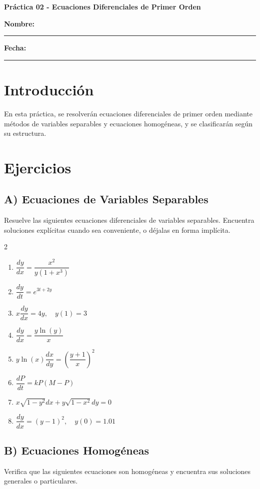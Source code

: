 \documentclass[a4paper,11pt]{article}
\begin{document}
\begin{center}
    \Large\textbf{Práctica 02 - Ecuaciones Diferenciales de Primer Orden}\\[0.5cm]  

\end{center}
  \textbf{Nombre:} \rule{9cm}{0.4pt}  \textbf{Fecha:} \rule{4.5cm}{0.4pt}

\section*{Introducción}
En esta práctica, se resolverán ecuaciones diferenciales de primer orden mediante métodos de variables separables y ecuaciones homogéneas, y se clasificarán según su estructura.

\section*{Ejercicios}

\subsection*{A) Ecuaciones de Variables Separables}
Resuelve las siguientes ecuaciones diferenciales de variables separables. Encuentra soluciones explícitas cuando sea conveniente, o déjalas en forma implícita.

\begin{multicols}{2}
\begin{enumerate}[itemsep=0.1cm]
    \item $\dfrac{dy}{dx} = \dfrac{x^2}{y(1+x^3)}$
    \item $\dfrac{dy}{dt} = e^{3t+2y}$
    \item $x \dfrac{dy}{dx} = 4y, \quad y(1) = 3$
    \item $\dfrac{dy}{dx} = \dfrac{y\ln(y)}{x}$
    \item $y \ln(x) \dfrac{dx}{dy} = \left(\dfrac{y+1}{x}\right)^2$
    \item $\dfrac{dP}{dt} = k P(M - P)$
    \item $x \sqrt{1-y^2} dx + y \sqrt{1-x^2} dy = 0$
    \item $\dfrac{dy}{dx} = (y-1)^2, \quad y(0) = 1.01$
\end{enumerate}
\end{multicols}

\subsection*{B) Ecuaciones Homogéneas}
Verifica que las siguientes ecuaciones son homogéneas y encuentra sus soluciones generales o particulares.
\end{document}
